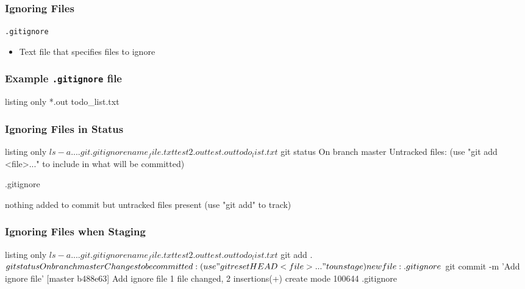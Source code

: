 \documentclass[english,compress]{beamer}
\newcommand{\cw}{\texttt} %
\begin{document}
\begin{frame}[fragile]
    \frametitle{Ignoring Files}
    \verb|.gitignore|
    \begin{itemize}
        \item Text file that specifies files to ignore
    \end{itemize}
\end{frame}

\begin{frame}[fragile]
    \frametitle{Example \cw{.gitignore} file}
    \begin{tcblisting}{listing only}
*.out
todo_list.txt
    \end{tcblisting}
\end{frame}

\begin{frame}[fragile]
    \frametitle{Ignoring Files in Status}
    \begin{tcblisting}{listing only}
$ ls -a
.  ..  .git  .gitignore  name_file.txt  test2.out  test.out  todo_list.txt
$ git status
On branch master
Untracked files:
  (use "git add <file>..." to include in what will be committed)

	.gitignore

nothing added to commit but untracked files present (use "git add" to track)
    \end{tcblisting}
\end{frame}

\begin{frame}[fragile]
    \frametitle{Ignoring Files when Staging}
    \begin{tcblisting}{listing only}
$ ls -a
.  ..  .git  .gitignore  name_file.txt  test2.out  test.out  todo_list.txt
$ git add .
$ git status
On branch master
Changes to be committed:
  (use "git reset HEAD <file>..." to unstage)

	new file:   .gitignore
$ git commit -m 'Add ignore file'
[master b488e63] Add ignore file
 1 file changed, 2 insertions(+)
 create mode 100644 .gitignore
    \end{tcblisting}
\end{frame}
\end{document}
